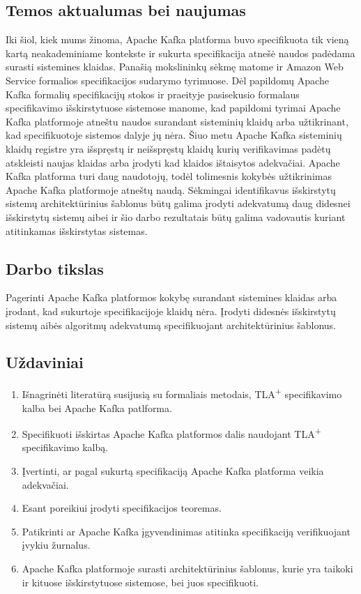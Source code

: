 \documentclass{VUMIFPSmagistrinis}
\begin{document}
	\subsection{Temos aktualumas bei naujumas}
		Iki šiol, kiek mums žinoma, Apache Kafka platforma buvo specifikuota tik vieną kartą\cite{kfkTla} neakademiniame kontekste ir sukurta specifikacija atnešė naudos padėdama surasti sistemines klaidas.
		Panašią mokslininkų sėkmę matome ir Amazon Web Service formalios specifikacijos sudarymo tyrimuose\cite{newcombe2014use}.
		Dėl papildomų Apache Kafka formalių specifikacijų stokos ir praeityje pasisekusio formalaus specifikavimo išskirstytuose sistemose manome, kad papildomi tyrimai Apache Kafka platformoje atneštu naudos surandant sisteminių klaidų arba užtikrinant, kad specifikuotoje sistemos dalyje jų nėra.
		Šiuo metu Apache Kafka sisteminių klaidų registre\cite{kfkissue} yra išspręstų ir neišspręstų  klaidų kurių verifikavimas padėtų atskleisti naujas klaidas arba įrodyti kad klaidos ištaisytos adekvačiai.
		Apache Kafka platforma turi daug naudotojų\cite{kfk}, todėl tolimesnis kokybės užtikrinimas Apache Kafka platformoje atneštų naudą.
		Sėkmingai identifikavus išskirstytų sistemų architektūrinius šablonus\cite{hohpe2004enterprise} būtų galima įrodyti adekvatumą daug didesnei išskirstytų sistemų aibei ir šio darbo rezultatais būtų galima vadovautis kuriant atitinkamas išskirstytas sistemas. 
	
	\subsection{Darbo tikslas}
		Pagerinti Apache Kafka platformos kokybę surandant sistemines klaidas arba įrodant, kad sukurtoje specifikacijoje klaidų nėra.
		Įrodyti didesnės išskirstytų sistemų aibės algoritmų adekvatumą specifikuojant architektūrinius šablonus.
	
	\subsection{Uždaviniai}
		\begin{enumerate}
			\item{Išnagrinėti literatūrą susijusią su formaliais metodais, TLA\textsuperscript{+} specifikavimo kalba bei Apache Kafka patlforma.}
			\item{Specifikuoti išskirtas Apache Kafka platformos dalis naudojant TLA\textsuperscript{+} specifikavimo kalbą.}
			\item{Įvertinti, ar pagal sukurtą specifikaciją Apache Kafka platforma veikia adekvačiai.}
			\item{Esant poreikiui įrodyti specifikacijos teoremas.}
			\item{Patikrinti ar Apache Kafka įgyvendinimas atitinka specifikaciją verifikuojant įvykiu žurnalus.}
			\item{Apache Kafka platformoje surasti architektūrinius šablonus, kurie yra taikoki ir kituose išskirstytuose sistemose, bei juos specifikuoti.}
		\end{enumerate}
	
\end{document}
